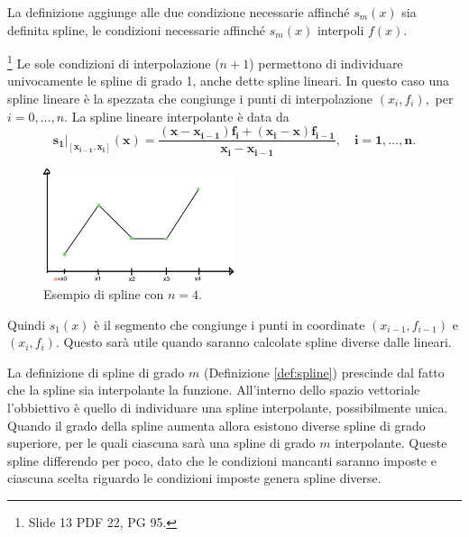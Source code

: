 La definizione aggiunge alle due condizione necessarie affinché $s_m(x)$ sia definita spline, le condizioni necessarie affinché $s_m(x)$ interpoli $f(x)$.

\begin{remark}
    \footnote{Slide 13 PDF 22, PG 95.} Le sole condizioni di interpolazione ($n+1$) permettono di individuare univocamente le spline di grado 1, anche dette spline lineari. In questo caso una spline lineare è la spezzata che congiunge i punti di interpolazione $(x_i,f_i),$ per $i=0,\hdots, n$. La spline lineare interpolante è data da 
    \begin{equation}\label{eq:splineLineare}
        \boldsymbol{s_1|_{[x_{i-1}, x_i]}(x)=\frac{(x-x_{i-1})f_i+(x_i-x)f_{i-1}}{x_i-x_{i-1}},\quad i=1,\hdots,n.}
    \end{equation}
\end{remark}

\begin{figure}
    \centering
    \includegraphics[width=0.5\textwidth]{immagini/s_mN=4.png}
    \caption{Esempio di spline con $n=4$.}\label{fig:s_mN=4}
\end{figure}

Quindi $s_1(x)$ è il segmento che congiunge i punti in coordinate $(x_{i-1},f_{i-1})$ e $(x_i,f_i)$. Questo sarà utile quando saranno calcolate spline diverse dalle lineari.

La definizione di spline di grado $m$ (Definizione \ref{def:spline}) prescinde dal fatto che la spline sia interpolante la funzione. All'interno dello spazio vettoriale l'obbiettivo è quello di individuare una spline interpolante, possibilmente unica.
Quando il grado della spline aumenta allora esistono diverse spline di grado superiore, per le quali ciascuna sarà una spline di grado $m$ interpolante. Queste spline differendo per poco, dato che le condizioni mancanti saranno imposte e ciascuna scelta riguardo le condizioni imposte genera spline diverse.

